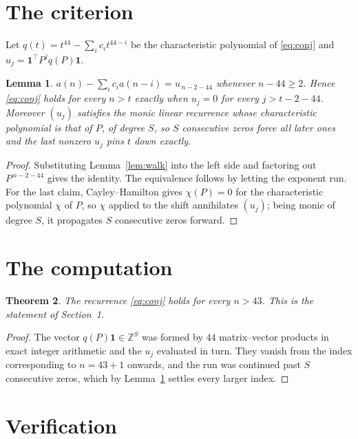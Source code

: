 \documentclass[11pt,a4paper]{article}
\theoremstyle{plain}
\newtheorem{theorem}{Theorem}
\newtheorem{lemma}[theorem]{Lemma}
\theoremstyle{definition}
\begin{document}
\section{The criterion}

Let $q(t)=t^{44}-\sum_i c_i t^{44-i}$ be the characteristic polynomial of
\eqref{eq:conj} and $u_j=\mathbf{1}^{\!\top}P^{j}q(P)\mathbf{1}$.

\begin{lemma}\label{lem:crit}
$a(n)-\sum_i c_i a(n-i)=u_{\,n-2-44}$ whenever $n-44\ge2$. Hence
\eqref{eq:conj} holds for every $n>t$ exactly when $u_j=0$ for every
$j>t-2-44$. Moreover $(u_j)$ satisfies the monic linear recurrence whose
characteristic polynomial is that of $P$, of degree $S$, so $S$ consecutive zeros force all
later ones and the last nonzero $u_j$ pins $t$ down exactly.
\end{lemma}

\begin{proof}
Substituting Lemma~\ref{lem:walk} into the left side and factoring out
$P^{\,n-2-44}$ gives the identity. The equivalence follows by letting the exponent
run. For the last claim, Cayley--Hamilton gives $\chi(P)=0$ for the characteristic
polynomial $\chi$ of $P$, so $\chi$ applied to the shift annihilates $(u_j)$; being monic of
degree $S$, it propagates $S$ consecutive zeros forward.
\end{proof}

\section{The computation}

\begin{theorem}
The recurrence \eqref{eq:conj} holds for every $n>43$. This is the statement of
Section~1.
\end{theorem}

\begin{proof}
The vector $q(P)\mathbf{1}\in\mathbb{Z}^{S}$ was formed by $44$ matrix--vector
products in exact integer arithmetic and the $u_j$ evaluated in turn. They vanish from the
index corresponding to $n=43+1$ onwards, and the run was continued past $S$ consecutive
zeros, which by Lemma~\ref{lem:crit} settles every larger index.
\end{proof}

\section{Verification}
\end{document}

